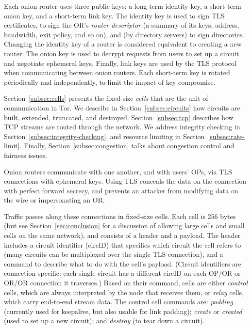\documentclass[times,10pt,twocolumn]{article}
\begin{document}
Each onion router uses three public keys: a long-term identity key, a
short-term onion key, and a short-term link key.  The identity
key is used to sign TLS certificates, to sign the OR's \emph{router
descriptor} (a summary of its keys, address, bandwidth, exit policy,
and so on), and (by directory servers) to sign directories. Changing
the identity key of a router is considered equivalent to creating a
new router. The onion key is used to decrypt requests
from users to set up a circuit and negotiate ephemeral keys. Finally,
link keys are used by the TLS protocol when communicating between
onion routers. Each short-term key is rotated periodically and
independently, to limit the impact of key compromise.

Section~\ref{subsec:cells} presents the fixed-size
\emph{cells} that are the unit of communication in Tor. We describe
in Section~\ref{subsec:circuits} how circuits are
built, extended, truncated, and destroyed. Section~\ref{subsec:tcp}
describes how TCP streams are routed through the network.  We address
integrity checking in Section~\ref{subsec:integrity-checking},
and resource limiting in Section~\ref{subsec:rate-limit}.
Finally,
Section~\ref{subsec:congestion} talks about congestion control and
fairness issues.

\label{subsec:cells}

Onion routers communicate with one another, and with users' OPs, via
TLS connections with ephemeral keys.  Using TLS conceals the data on
the connection with perfect forward secrecy, and prevents an attacker
from modifying data on the wire or impersonating an OR.

Traffic passes along these connections in fixed-size cells.  Each cell
is 256 bytes (but see Section~\ref{sec:conclusion} for a discussion of
allowing large cells and small cells on the same network), and
consists of a header and a payload. The header includes a circuit
identifier (circID) that specifies which circuit the cell refers to
(many circuits can be multiplexed over the single TLS connection), and
a command to describe what to do with the cell's payload.  (Circuit
identifiers are connection-specific: each single circuit has a different
circID on each OP/OR or OR/OR connection it traverses.)
Based on their command, cells are either \emph{control} cells, which are
always interpreted by the node that receives them, or \emph{relay} cells,
which carry end-to-end stream data.   The control cell commands are:
\emph{padding} (currently used for keepalive, but also usable for link
padding); \emph{create} or \emph{created} (used to set up a new circuit);
and \emph{destroy} (to tear down a circuit).
\end{document}
